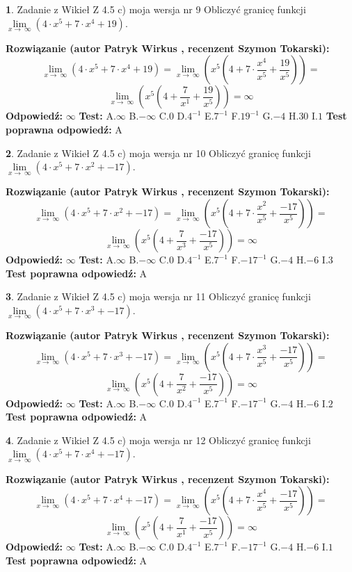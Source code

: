 \documentclass[12pt, a4paper]{article}
\theoremstyle{definition} %
\newtheorem{zad}{}
\newcommand{\zadStart}[1]{\begin{zad}#1\newline}
\newcommand{\zadStop}{\end{zad}}
\newcommand{\rozwStart}[2]{\noindent \textbf{Rozwiązanie (autor #1 , recenzent #2): }\newline}
\newcommand{\rozwStop}{\newline}
\newcommand{\odpStart}{\noindent \textbf{Odpowiedź:}\newline}
\newcommand{\odpStop}{\newline}
\newcommand{\testStart}{\noindent \textbf{Test:}\newline}
\newcommand{\testStop}{\newline}
\newcommand{\kluczStart}{\noindent \textbf{Test poprawna odpowiedź:}\newline}
\newcommand{\kluczStop}{\newline}
\begin{document}
\zadStart{Zadanie z Wikieł Z 4.5 c) moja wersja nr 9}
Obliczyć granicę funkcji  $\lim\limits_{x\to\ \infty}(4 \cdot x^{5}+7 \cdot x^{4}+19)$.
\zadStop
\rozwStart{Patryk Wirkus}{Szymon Tokarski}
$$\lim\limits_{x\to\ \infty}(4 \cdot x^{5}+7 \cdot x^{4}+19) = \lim\limits_{x\to\ \infty}(x^{5}(4 +7 \cdot \frac{x^{4}}{x^{5}}+\frac{19}{x^{5}})) =$$ $$\lim\limits_{x\to\ \infty}(x^{5}(4 +\frac{7}{x^{1}}+\frac{19}{x^{5}})) =\infty$$
\rozwStop
\odpStart
$\infty$
\odpStop
\testStart
A.$\infty$ B.$-\infty$ C.$0$ D.$4^{-1}$ E.$7^{-1}$
F.$19^{-1}$ G.$-4$
H.$30$
I.$1$
\testStop
\kluczStart
A
\kluczStop



\zadStart{Zadanie z Wikieł Z 4.5 c) moja wersja nr 10}
Obliczyć granicę funkcji  $\lim\limits_{x\to\ \infty}(4 \cdot x^{5}+7 \cdot x^{2}+-17)$.
\zadStop
\rozwStart{Patryk Wirkus}{Szymon Tokarski}
$$\lim\limits_{x\to\ \infty}(4 \cdot x^{5}+7 \cdot x^{2}+-17) = \lim\limits_{x\to\ \infty}(x^{5}(4 +7 \cdot \frac{x^{2}}{x^{5}}+\frac{-17}{x^{5}})) =$$ $$\lim\limits_{x\to\ \infty}(x^{5}(4 +\frac{7}{x^{3}}+\frac{-17}{x^{5}})) =\infty$$
\rozwStop
\odpStart
$\infty$
\odpStop
\testStart
A.$\infty$ B.$-\infty$ C.$0$ D.$4^{-1}$ E.$7^{-1}$
F.$-17^{-1}$ G.$-4$
H.$-6$
I.$3$
\testStop
\kluczStart
A
\kluczStop



\zadStart{Zadanie z Wikieł Z 4.5 c) moja wersja nr 11}
Obliczyć granicę funkcji  $\lim\limits_{x\to\ \infty}(4 \cdot x^{5}+7 \cdot x^{3}+-17)$.
\zadStop
\rozwStart{Patryk Wirkus}{Szymon Tokarski}
$$\lim\limits_{x\to\ \infty}(4 \cdot x^{5}+7 \cdot x^{3}+-17) = \lim\limits_{x\to\ \infty}(x^{5}(4 +7 \cdot \frac{x^{3}}{x^{5}}+\frac{-17}{x^{5}})) =$$ $$\lim\limits_{x\to\ \infty}(x^{5}(4 +\frac{7}{x^{2}}+\frac{-17}{x^{5}})) =\infty$$
\rozwStop
\odpStart
$\infty$
\odpStop
\testStart
A.$\infty$ B.$-\infty$ C.$0$ D.$4^{-1}$ E.$7^{-1}$
F.$-17^{-1}$ G.$-4$
H.$-6$
I.$2$
\testStop
\kluczStart
A
\kluczStop



\zadStart{Zadanie z Wikieł Z 4.5 c) moja wersja nr 12}
Obliczyć granicę funkcji  $\lim\limits_{x\to\ \infty}(4 \cdot x^{5}+7 \cdot x^{4}+-17)$.
\zadStop
\rozwStart{Patryk Wirkus}{Szymon Tokarski}
$$\lim\limits_{x\to\ \infty}(4 \cdot x^{5}+7 \cdot x^{4}+-17) = \lim\limits_{x\to\ \infty}(x^{5}(4 +7 \cdot \frac{x^{4}}{x^{5}}+\frac{-17}{x^{5}})) =$$ $$\lim\limits_{x\to\ \infty}(x^{5}(4 +\frac{7}{x^{1}}+\frac{-17}{x^{5}})) =\infty$$
\rozwStop
\odpStart
$\infty$
\odpStop
\testStart
A.$\infty$ B.$-\infty$ C.$0$ D.$4^{-1}$ E.$7^{-1}$
F.$-17^{-1}$ G.$-4$
H.$-6$
I.$1$
\testStop
\kluczStart
A
\kluczStop
\end{document}
